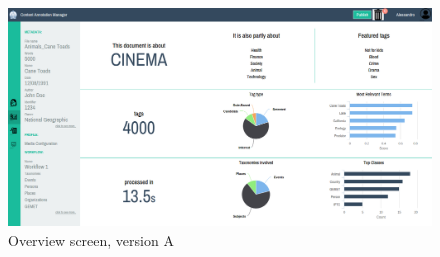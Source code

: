 \documentclass[12pt,svgnames]{memoir}
\begin{document}
\begin{figure}[htbp]
\centering
\includegraphics{./src/img/overview-A.png}
\caption{Overview screen, version A}
\end{figure}
\end{document}
